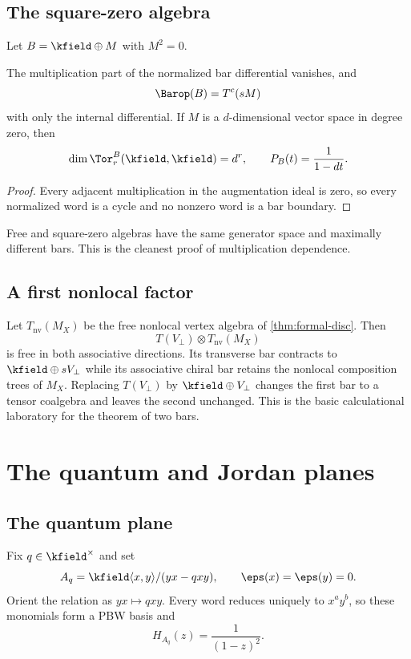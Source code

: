 \section{The square-zero algebra}
Let \(B=\kfield\oplus M\) with \(M^2=0\).

\begin{proposition}\label{prop:square-zero}
The multiplication part of the normalized bar differential vanishes, and
\[
 \Barop(B)=T^c(sM)
\]
with only the internal differential.  If \(M\) is a \(d\)-dimensional vector space in degree zero, then
\[
 \dim\Tor_r^B(\kfield,\kfield)=d^r,
 \qquad
 P_B(t)=\frac{1}{1-dt}.
\]
\end{proposition}
\begin{proof}
Every adjacent multiplication in the augmentation ideal is zero, so every normalized word is a cycle and no nonzero word is a bar boundary.
\end{proof}

Free and square-zero algebras have the same generator space and maximally different bars.  This is the cleanest proof of multiplication dependence.

\section{A first nonlocal factor}
Let \(T_{\mathrm{nv}}(M_X)\) be the free nonlocal vertex algebra of \cref{thm:formal-disc}.  Then
\[
 T(V_\perp)\otimes T_{\mathrm{nv}}(M_X)
\]
is free in both associative directions.  Its transverse bar contracts to \(\kfield\oplus sV_\perp\) while its associative chiral bar retains the nonlocal composition trees of \(M_X\).  Replacing \(T(V_\perp)\) by \(\kfield\oplus V_\perp\) changes the first bar to a tensor coalgebra and leaves the second unchanged.  This is the basic calculational laboratory for the theorem of two bars.

\chapter{The quantum and Jordan planes}\label{chap:planes}

\section{The quantum plane}
Fix \(q\in\kfield^\times\) and set
\[
 A_q=\kfield\langle x,y\rangle/(yx-qxy),
 \qquad \eps(x)=\eps(y)=0.
\]
Orient the relation as \(yx\mapsto qxy\).  Every word reduces uniquely to \(x^ay^b\), so these monomials form a PBW basis and
\[
 H_{A_q}(z)=\frac{1}{(1-z)^2}.
\]

